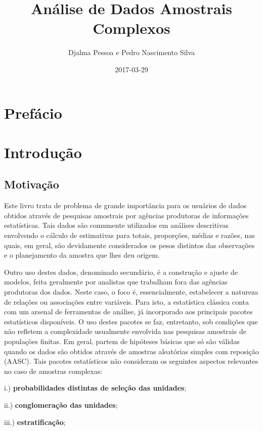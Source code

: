 \documentclass[]{book}
\title{Análise de Dados Amostrais Complexos}
\author{Djalma Pessoa e Pedro Nascimento Silva}
\date{2017-03-29}
\numberwithin{example}{chapter}
\numberwithin{remark}{chapter}
\numberwithin{definition}{chapter}
\begin{document}
\maketitle

{
\setcounter{tocdepth}{1}
\tableofcontents
}
\chapter*{Prefácio}\label{prefacio}

\chapter{Introdução}\label{introduc}

\section{Motivação}\label{motivacao}

Este livro trata de problema de grande importância para os usuários de
dados obtidos através de pesquisas amostrais por agências produtoras de
informações estatísticas. Tais dados são comumente utilizados em
análises descritivas envolvendo o cálculo de estimativas para totais,
proporções, médias e razões, nas quais, em geral, são devidamente
considerados os pesos distintos das observações e o planejamento da
amostra que lhes deu origem.

Outro uso destes dados, denominado secundário, é a construção e ajuste
de modelos, feita geralmente por analistas que trabalham fora das
agências produtoras dos dados. Neste caso, o foco é, essencialmente,
estabelecer a natureza de relações ou associações entre variáveis. Para
isto, a estatística clássica conta com um arsenal de ferramentas de
análise, já incorporado aos principais pacotes estatísticos disponíveis.
O uso destes pacotes se faz, entretanto, sob condições que não refletem
a complexidade usualmente envolvida nas pesquisas amostrais de
populações finitas. Em geral, partem de hipóteses básicas que só são
válidas quando os dados são obtidos através de amostras aleatórias
simples com reposição (AASC). Tais pacotes estatísticos não consideram
os seguintes aspectos relevantes no caso de amostras complexas:

i.) \textbf{probabilidades distintas de seleção das unidades};

ii.) \textbf{conglomeração das unidades};

iii.) \textbf{estratificação};
\end{document}
